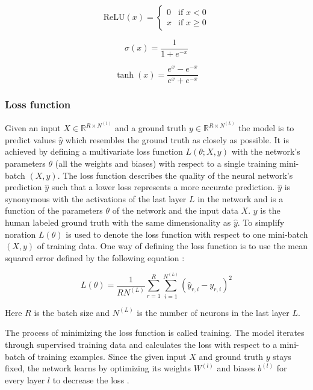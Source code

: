 \documentclass[a4paper, twoside]{article}
\begin{document}
\begin{equation}\label{relu}
\mbox{ReLU}{(x)} = \begin{cases} 
			0 & \mbox{if } x < 0 \\ 
			x & \mbox{if } x \geq 0 
		\end{cases}
\end{equation}

\begin{equation}\label{sigmoid}
\sigma(x) = \frac{1}{1+e^{-x}}
\end{equation}

\begin{equation}\label{tanh}
\tanh{(x)} = \frac{e^x-e^{-x}}{e^x+e^{-x}}
\end{equation}

\subsubsection{Loss function}
Given an input $X \in \mathbb{R}^{R \times N^{(1)}}$ and a ground truth $y \in \mathbb{R}^{R \times N^{(L)}}$ the model is to predict values $\hat{y}$ which resembles the ground truth as closely as possible. It is achieved by defining a multivariate loss function $L(\theta; X, y)$  with the network's parameters $\theta$ (all the weights and biases) with respect to a single training mini-batch $(X, y)$. The loss function describes the quality of the neural network's prediction $\hat{y}$ such that a lower loss represents a more accurate prediction. $\hat{y}$ is synonymous with the activations of the last layer $L$ in the network and is a function of the parameters $\theta$ of the network and the input data $X$. $y$ is the human labeled ground truth with the same dimensionality as $\hat{y}$. To simplify noration $L(\theta)$ is used to denote the loss function with respect to one mini-batch $(X, y)$ of training data. One way of defining the loss function is to use the mean squared error defined by the following equation \cite{cs231n}:

\begin{equation}\label{MSE}
L(\theta) = \frac{1}{RN^{(L)}} \sum^{R}_{r=1} \sum^{N^{(L)}}_{i=1} (\hat{y}_{r,i}-y_{r,i})^2
\end{equation}

Here $R$ is the batch size and $N^{(L)}$ is the number of neurons in the last layer $L$.

The process of minimizing the loss function is called training. The model iterates through supervised training data and calculates the loss with respect to a mini-batch of training examples. Since the given input $X$ and ground truth $y$ stays fixed, the network learns by optimizing its weights $W^{(l)}$ and biases $b^{(l)}$ for every layer $l$ to decrease the loss \cite{cs231n} \cite{wikiStanford}.
\end{document}
